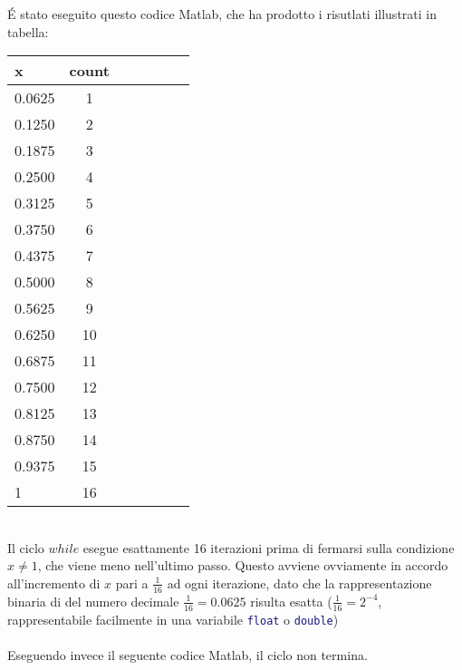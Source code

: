 \begin{center}
\footnotesize\noindent{}\end{center}

\noindent \'E stato eseguito questo codice Matlab, che ha prodotto i risutlati illustrati in tabella:
\\



\begin{tabular}{l*{6}{c}}
 x  &  count \\
\hline
 0.0625 & 1 \\
 0.1250 & 2 \\
 0.1875 & 3 \\
 0.2500 & 4 \\
 0.3125 & 5 \\
 0.3750 & 6 \\
 0.4375 & 7 \\
 0.5000 & 8 \\
 0.5625 & 9 \\
 0.6250 & 10 \\
 0.6875 & 11 \\
 0.7500 & 12 \\
 0.8125 & 13 \\
 0.8750 & 14 \\
 0.9375 & 15 \\
      1 & 16 \\
\end{tabular} \\

\noindent Il ciclo \(while\) esegue esattamente 16 iterazioni prima di fermarsi sulla condizione \(x \neq 1\), che viene meno nell'ultimo passo. Questo avviene ovviamente in accordo all'incremento di \(x\) pari a \(\frac{1}{16}\) ad ogni iterazione, dato che la rappresentazione binaria di del numero decimale \(\frac{1}{16} = 0.0625\) risulta esatta (\( \frac{1}{16} = 2^{-4}\), rappresentabile facilmente in una variabile \lstinline[language=Matlab]{float} o \lstinline[language=Matlab]{double})
\\
\\
\noindent Eseguendo invece il seguente codice Matlab, il ciclo non termina.

